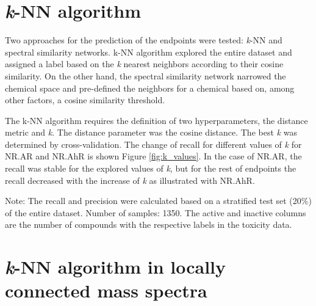 \section*{\textit{k}-NN algorithm}

Two approaches for the prediction of the endpoints were tested: \textit{k}-NN and spectral similarity networks. {k}-NN algorithm explored the entire dataset and assigned a label based on the \textit{k} nearest neighbors according to their cosine similarity. On the other hand, the spectral similarity network narrowed the chemical space and pre-defined the neighbors for a chemical based on, among other factors, a cosine similarity threshold. 

The {k}-NN algorithm requires the definition of two hyperparameters, the distance metric and \textit{k}. The distance parameter was the cosine distance. The best \textit{k} was determined by cross-validation. The change of recall for different values of \textit{k} for NR.AR and NR.AhR is shown Figure \ref{fig:k_values}. In the case of NR.AR, the recall was stable for the explored values of \textit{k}, but for the rest of endpoints the recall decreased with the increase of \textit{k} as illustrated with NR.AhR.

\begin{table}[h]
\centering
\footnotesize
{}
\caption*{Note: The recall and precision were calculated based on a stratified test set (20\%) of the entire dataset. Number of samples: 1350. The active and inactive columns are the number of compounds with the respective labels in the toxicity data.}
\end{table}




\clearpage
{}
\section*{\textit{k}-NN algorithm in locally connected mass spectra}

